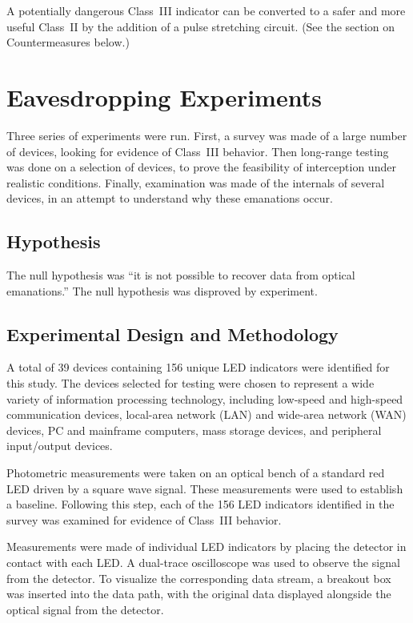 \documentclass[twocolumn]{article}
\begin{document}
A potentially dangerous Class~III indicator can be converted to a safer and more useful Class~II by the addition of a pulse stretching circuit. \cite{pulse_stretcher} (See the section on Countermeasures below.)

\section{Eavesdropping Experiments}

Three series of experiments were run.  First, a survey was made of a large number of devices, looking for evidence of Class~III behavior.  Then long-range testing was done on a selection of devices, to prove the feasibility of interception under realistic conditions.  Finally, examination was made of the internals of several devices, in an attempt to understand why these emanations occur.

\subsection{Hypothesis}

The null hypothesis was “it is not possible to recover data from optical emanations.”  The null hypothesis was disproved by experiment.
 
\subsection{Experimental Design and Methodology}

A total of 39 devices containing 156 unique LED indicators were identified for this study.  The devices selected for testing were chosen to represent a wide variety of information processing technology, including low-speed and high-speed communication devices, local-area network (LAN) and wide-area network (WAN) devices, PC and mainframe computers, mass storage devices, and peripheral input/output devices.

Photometric measurements were taken on an optical bench of a standard red LED driven by a square wave signal.  These measurements were used to establish a baseline.  Following this step, each of the 156 LED indicators identified in the survey was examined for evidence of Class~III behavior.

Measurements were made of individual LED indicators by placing the detector in contact with each LED.  A dual-trace oscilloscope was used to observe the signal from the detector.  To visualize the corresponding data stream, a breakout box was inserted into the data path, with the original data displayed alongside the optical signal from the detector. 
 
\end{document}
